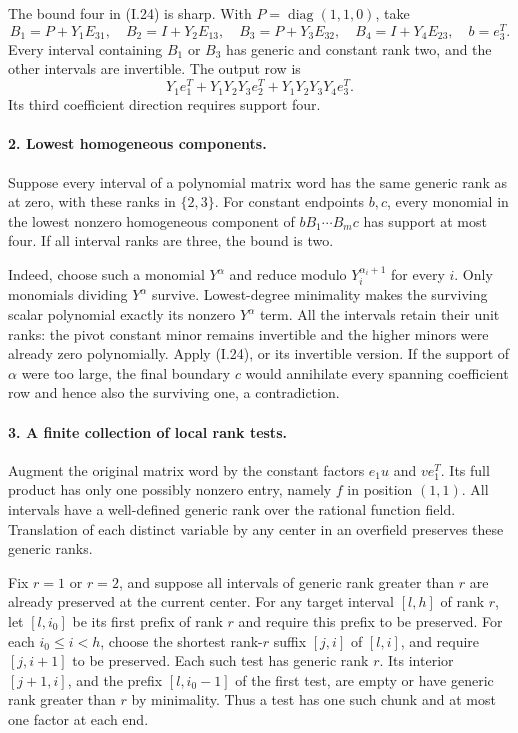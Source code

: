 The bound four in (I.24) is sharp.  With $P=\operatorname{diag}(1,1,0)$,
take
\[
 B_1=P+Y_1E_{31},\quad B_2=I+Y_2E_{13},\quad
 B_3=P+Y_3E_{32},\quad B_4=I+Y_4E_{23},\quad b=e_3^T.
\]
Every interval containing $B_1$ or $B_3$ has generic and constant
rank two, and the other intervals are invertible.  The output row is
\[
 Y_1e_1^T+Y_1Y_2Y_3e_2^T+Y_1Y_2Y_3Y_4e_3^T.
\]
Its third coefficient direction requires support four.

\paragraph{2. Lowest homogeneous components.}
Suppose every interval of a polynomial matrix word has the same
generic rank as at zero, with these ranks in $\{2,3\}$.  For constant
endpoints $b,c$, every monomial in the lowest nonzero homogeneous
component of $bB_1\cdots B_mc$ has support at most four.  If all
interval ranks are three, the bound is two.

Indeed, choose such a monomial $Y^\alpha$ and reduce modulo
$Y_i^{\alpha_i+1}$ for every $i$.  Only monomials dividing
$Y^\alpha$ survive.  Lowest-degree minimality makes the surviving
scalar polynomial exactly its nonzero $Y^\alpha$ term.  All the
intervals retain their unit ranks: the pivot constant minor remains
invertible and the higher minors were already zero polynomially.
Apply (I.24), or its invertible version.  If the support of $\alpha$
were too large, the final boundary $c$ would annihilate every
spanning coefficient row and hence also the surviving one, a
contradiction.

\paragraph{3. A finite collection of local rank tests.}
Augment the original matrix word by the constant factors $e_1u$
and $ve_1^T$.  Its full product has only one possibly nonzero entry,
namely $f$ in position $(1,1)$.  All intervals have a well-defined
generic rank over the rational function field.  Translation of
each distinct variable by any center in an overfield preserves
these generic ranks.

Fix $r=1$ or $r=2$, and suppose all intervals of generic rank
greater than $r$ are already preserved at the current center.
For any target interval $[l,h]$ of rank $r$, let $[l,i_0]$ be its
first prefix of rank $r$ and require this prefix to be preserved.
For each $i_0\le i<h$, choose the shortest rank-$r$ suffix $[j,i]$
of $[l,i]$, and require $[j,i+1]$ to be preserved.  Each such test
has generic rank $r$.  Its interior $[j+1,i]$, and the prefix
$[l,i_0-1]$ of the first test, are empty or have generic rank
greater than $r$ by minimality.  Thus a test has one such chunk
and at most one factor at each end.

